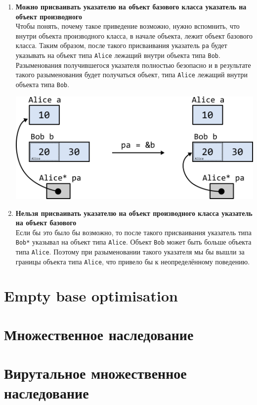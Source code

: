 \documentclass{article}
\begin{document}
\begin{enumerate}
\item \textbf{Можно присваивать указателю на объект базового класса указатель на объект производного}\\
Чтобы понять, почему такое приведение возможно, нужно вспомнить, что внутри объекта производного класса, в начале объекта, лежит объект базового класса. Таким образом, после такого присваивания указатель \texttt{pa} будет указывать на объект типа \texttt{Alice} лежащий внутри объекта типа \texttt{Bob}. Разыменования получившегося указателя полностью безопасно и в результате такого разыменования будет получаться объект, типа \texttt{Alice} лежащий внутри объекта типа \texttt{Bob}.

\begin{center}
\includegraphics[scale=0.9]{../images/alice_bob_pointer1.png}
\end{center}

\item \textbf{Нельзя присваивать указателю на объект производного класса указатель на объект базового}\\
Если бы это было бы возможно, то после такого присваивания указатель типа \texttt{Bob*} указывал на объект типа \texttt{Alice}. Объект \texttt{Bob} может быть больше объекта типа \texttt{Alice}. Поэтому при разыменовании такого указателя мы бы вышли за границы объекта типа \texttt{Alice}, что привело бы к неопределённому поведению.
\end{enumerate}


\newpage
\section{Empty base optimisation}
\section{Множественное наследование}
\section{Вирутальное множественное наследование}
\end{document}
